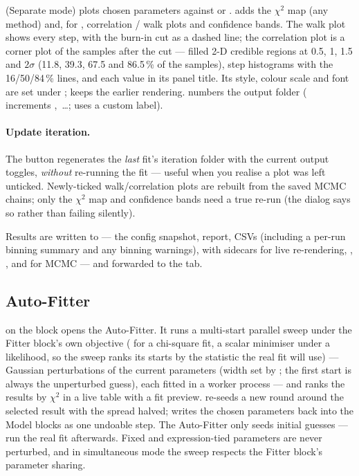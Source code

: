  (Separate mode) plots chosen parameters against
 or .  adds the
$\chi^2$ map (any method) and, for , correlation / walk
plots and confidence bands. The walk plot shows every step, with the
burn-in cut as a dashed line; the correlation plot is a corner plot of
the samples after the cut --- filled 2-D credible regions at 0.5, 1,
1.5 and $2\sigma$ (11.8, 39.3, 67.5 and 86.5\,\% of the samples), step
histograms with the 16/50/84\,\% lines, and each value in its panel
title. Its style, colour scale and font are set under
;  keeps the
earlier rendering.  numbers the output
folder ( increments ,~\dots; 
uses a custom label).

\paragraph{Update iteration.}
The  button regenerates the \emph{last} fit's
iteration folder with the current output toggles, \emph{without}
re-running the fit --- useful when you realise a plot was left
unticked. Newly-ticked walk/correlation plots are rebuilt from the
saved MCMC chains; only the $\chi^2$ map and confidence bands need a
true re-run (the dialog says so rather than failing silently).

Results are written to
 --- the config
snapshot, report, CSVs (including a per-run binning summary and any
binning warnings),  with  sidecars for live
re-rendering, , , and
 for MCMC --- and forwarded to the  tab.

\subsection{Auto-Fitter}
\label{sec:autofitter}

 on the  block opens the
Auto-Fitter. It runs a multi-start parallel sweep under the
Fitter block's own objective ( for a chi-square fit,
a scalar minimiser under a likelihood, so the sweep ranks its
starts by the statistic the real fit will use) ---
 Gaussian perturbations of the current parameters (width
set by ; the first start is always the unperturbed
guess), each fitted in a worker process --- and ranks the results by
$\chi^2$ in a live table with a fit preview.  re-seeds a
new round around the selected result with the spread halved;
 writes the chosen parameters back into the
Model blocks as one undoable step. The Auto-Fitter only seeds
initial guesses --- run the real fit afterwards. Fixed and
expression-tied parameters are never perturbed, and in simultaneous
mode the sweep respects the Fitter block's parameter sharing.

